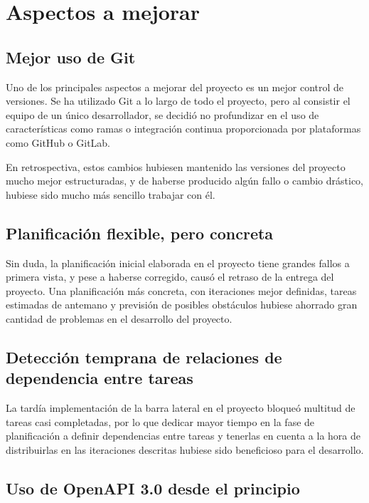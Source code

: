 \documentclass[10pt, a4paper]{aqademic}
\begin{document}
\section{Aspectos a mejorar}

\subsection*{Mejor uso de Git}

Uno de los principales aspectos a mejorar del proyecto es un mejor control de versiones. Se ha utilizado Git a lo largo de todo el proyecto, pero al consistir el equipo de un único desarrollador, se decidió no profundizar en el uso de características como ramas o integración continua proporcionada por plataformas como GitHub o GitLab.

En retrospectiva, estos cambios hubiesen mantenido las versiones del proyecto mucho mejor estructuradas, y de haberse producido algún fallo o cambio drástico, hubiese sido mucho más sencillo trabajar con él.


\subsection*{Planificación flexible, pero concreta}

Sin duda, la planificación inicial elaborada en el proyecto tiene grandes fallos a primera vista, y pese a haberse corregido, causó el retraso de la entrega del proyecto.
Una planificación más concreta, con iteraciones mejor definidas, tareas estimadas de antemano y previsión de posibles obstáculos hubiese ahorrado gran cantidad de problemas en el desarrollo del proyecto.


\subsection*{Detección temprana de relaciones de dependencia entre tareas}

La tardía implementación de la barra lateral en el proyecto bloqueó multitud de tareas casi completadas, por lo que dedicar mayor tiempo en la fase de planificación a definir dependencias entre tareas y tenerlas en cuenta a la hora de distribuirlas en las iteraciones descritas hubiese sido beneficioso para el desarrollo.


\subsection*{Uso de OpenAPI 3.0 desde el principio}
\end{document}
